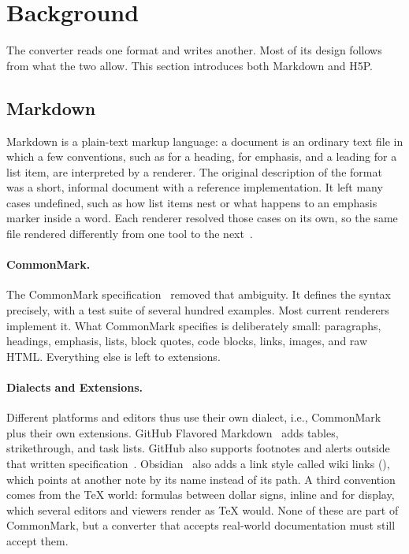 \section{Background}
\label{sec:background}

The converter reads one format and writes another. Most of its design follows from what the
two allow.
This section introduces both Markdown and H5P.

\subsection{Markdown}
\label{sec:bg_markdown}

Markdown is a plain-text markup language: a document is an ordinary text file in which a few
conventions, such as \code{\#} for a heading, \code{*} for emphasis, and a leading \code{-} for a
list item, are interpreted by a renderer.
The original description of the
format~\cite{Gruber:Markdown} was a short, informal document with a reference implementation. It left many cases undefined, such as how list items nest or what happens to an emphasis marker
inside a word.
Each renderer resolved those cases on its own, so the same file rendered
differently from one tool to the next~\cite[Section 1.2]{CommonMark:Spec}.

\paragraph{CommonMark.}
The CommonMark specification~\cite{CommonMark:Spec} removed that ambiguity.
It defines the syntax precisely, with a test suite of several hundred examples. Most current
renderers implement it.
What CommonMark specifies is deliberately small: paragraphs, headings,
emphasis, lists, block quotes, code blocks, links, images, and raw HTML.
Everything else is left to
extensions.

\paragraph{Dialects and Extensions.}
Different platforms and editors thus use their own dialect, i.e., CommonMark
plus their own extensions.
GitHub Flavored Markdown~\cite{GitHub:GFM} adds tables,
strike\-through, and task lists. GitHub also supports footnotes and alerts outside that written
specification~\cite{GitHub:Writing}.
Obsidian~\cite{Obsidian:Links} also adds a link style called wiki links (\code{[[Target]]}), which points at another note by its name instead of
its path.
A third convention comes from the \TeX{} world: formulas between dollar signs, 
inline and  for display, which several editors and viewers render as \TeX{} would.
None of these are part of CommonMark, but a converter that accepts real-world documentation
must still accept them.

